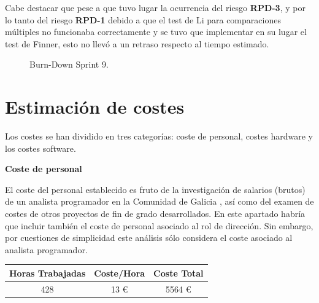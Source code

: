 Cabe destacar que pese a que tuvo lugar la ocurrencia del riesgo \textbf{RPD-3}, y por lo tanto del riesgo \textbf{RPD-1} debido a que el test de Li para comparaciones múltiples no funcionaba correctamente y se tuvo que implementar en su lugar el test de Finner, esto no llevó a un retraso respecto al tiempo estimado.

\begin{figure}[h]
\centering
{}
\caption{Burn-Down Sprint 9.}
\label{fig:bd3}
\end{figure}

\section{Estimación de costes}

Los costes se han dividido en tres categorías: coste de personal, costes hardware y los costes software.

\noindent
\textbf{Coste de personal}

El coste del personal establecido es fruto de la investigación de salarios (brutos) de un analista programador en la Comunidad de Galicia \cite{payscale}, así como del examen de costes de otros proyectos de fin de grado desarrollados. En este apartado habría que incluir también el coste de personal asociado al rol de dirección. Sin embargo, por cuestiones de simplicidad este análisis sólo considera el coste asociado al analista programador.

\begin{table}[H]
	\centering
	\begin{tabular}{|c|c|c|}
		\hline
		\textbf{Horas Trabajadas} & \textbf{Coste/Hora} & \textbf{Coste Total} \\ \hline
		428 & 13 \euro & 5564 \euro \\ \hline
	\end{tabular}
\end{table}

